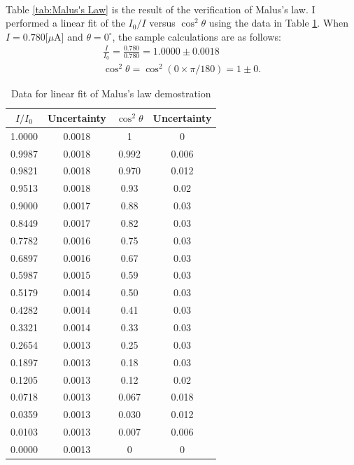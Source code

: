 \documentclass{my_template}
\begin{document}
    \paragraph{} Table \ref{tab:Malus's Law} is the result of the verification of Malus's law. I performed a linear fit of the $I_0/I$ versus $\cos^2\theta$ using the data in Table \ref{tab:Malus's Law Linear Fit}. When $I=0.780[\mu$A] and $\theta=0^\circ$, the sample calculations are as follows: 
    \begin{eqnarray*}
        \frac{I}{I_0}=\frac{0.780}{0.780}=1.0000\pm 0.0018\\
        \cos^2\theta=\cos^2(0\times\pi/180)=1\pm 0.
    \end{eqnarray*}
    \begin{table}[!ht]
        \centering
        \begin{tabular}{|c|c||c|c|}
            \hline
            $I/I_0$&Uncertainty&$\cos^2\theta$&Uncertainty\\\hline
            1.0000&0.0018&1&0\\\hline
            0.9987&0.0018&0.992&0.006\\\hline
            0.9821&0.0018&0.970&0.012\\\hline
            0.9513&0.0018&0.93&0.02\\\hline
            0.9000&0.0017&0.88&0.03\\\hline
            0.8449&0.0017&0.82&0.03\\\hline
            0.7782&0.0016&0.75&0.03\\\hline
            0.6897&0.0016&0.67&0.03\\\hline
            0.5987&0.0015&0.59&0.03\\\hline
            0.5179&0.0014&0.50&0.03\\\hline
            0.4282&0.0014&0.41&0.03\\\hline
            0.3321&0.0014&0.33&0.03\\\hline
            0.2654&0.0013&0.25&0.03\\\hline
            0.1897&0.0013&0.18&0.03\\\hline
            0.1205&0.0013&0.12&0.02\\\hline
            0.0718&0.0013&0.067&0.018\\\hline
            0.0359&0.0013&0.030&0.012\\\hline
            0.0103&0.0013&0.007&0.006\\\hline
            0.0000&0.0013&0&0\\\hline
        \end{tabular}
        \caption{Data for linear fit of Malus's law demostration}
        \label{tab:Malus's Law Linear Fit}
    \end{table}
\end{document}
